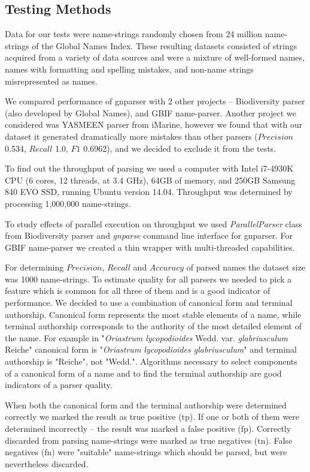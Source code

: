 \documentclass{bmcart}
\begin{document}
\subsection*{Testing Methods}

Data for our tests were name-strings randomly chosen from 24 million
name-strings of the Global Names Index. These resulting datasets consisted of
strings acquired from a variety of data sources and were a mixture of
well-formed names, names with formatting and spelling mistakes, and non-name
strings misrepresented as names.

We compared performance of gnparser with 2 other projects -- Biodiversity
parser\cite{biodiversity} (also developed by Global Names), and GBIF
name-parser\cite{gbifNameParser}. Another project we considered was YASMEEN
parser from iMarine\cite{VandenBerghe2015}, however we found that with our
dataset it generated dramatically more mistakes than other parsers
($Precision$ 0.534, $Recall$ 1.0, $F1$ 0.6962), and we decided to exclude it
from the tests.

To find out the throughput of parsing we used a computer with Intel i7-4930K
CPU (6 cores, 12 threads, at 3.4 GHz), 64GB of memory, and 250GB Samsung 840
EVO SSD, running Ubuntu version 14.04. Throughput was determined by processing
1,000,000 name-strings.

To study effects of parallel execution on throughput we used
\textit{ParallelParser} class from Biodiversity parser and \textit{gnparse}
command line interface for gnparser. For GBIF name-parser we created a thin
wrapper with multi-threaded capabilities\cite{gbifparser}.

For determining $Precision$, $Recall$ and $Accuracy$ of parsed names the
dataset size was 1000 name-strings. To estimate quality for all parsers we
needed to pick a feature which is common for all three of them and is a good
indicator of performance.  We decided to use a combination of canonical form
and terminal authorship.  Canonical form represents the most stable elements
of a name, while terminal authorship corresponds to the authority of the most
detailed element of the name. For example in "\textit{Oriastrum lycopodioides}
Wedd.  var.  \textit{glabriusculum} Reiche" canonical form is
"\textit{Oriastrum lycopodioides glabriusculum}" and terminal authorship is
"Reiche", not "Wedd.".  Algorithms necessary to select components of a
canonical form of a name and to find the terminal authorship are good
indicators of a parser quality.

When both the canonical form and the terminal authorship were determined
correctly we marked the result as true positive ($\text{tp}$).  If one or both
of them were determined incorrectly -- the result was marked a false positive
($\text{fp}$). Correctly discarded from parsing name-strings were marked as
true negatives ($\text{tn}$). False negatives ($\text{fn}$) were "suitable"
name-strings which should be parsed, but were nevertheless discarded.
\end{document}
